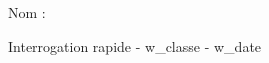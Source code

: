 
\setcounter{exo}{0}
\setcounter{que}{0}
\begin{minipage}{0.15\textwidth}
    Nom : 
\end{minipage}
\begin{minipage}{0.8\textwidth}
    \begin{flushright}
        Interrogation rapide - {w_classe} - {w_date}
    \end{flushright}
\end{minipage}
\newline
\vspace{1pt}
\hrulefill 
\vspace{3pt}

